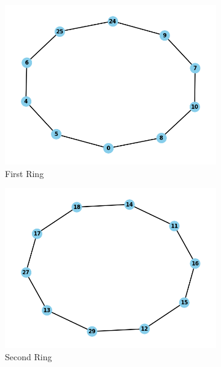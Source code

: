 \documentclass[11pt]{article}
\begin{document}
\begin{figure}[H]
    \centering
    \begin{subfigure}{0.32\textwidth}
        \centering
        \includegraphics[width=\linewidth]{ring1.png}
        \caption{First Ring}
        \label{fig:ring1}
    \end{subfigure}\hfill
    \begin{subfigure}{0.32\textwidth}
        \centering
        \includegraphics[width=\linewidth]{ring2.png}
        \caption{Second Ring}
        \label{fig:ring2}
    \end{subfigure}\hfill
    \begin{subfigure}{0.32\textwidth}
        \centering

\end{subfigure}
\end{figure}
\end{document}
